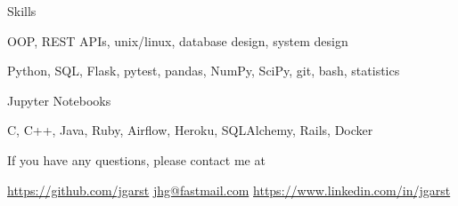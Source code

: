 \documentclass[11pt,a4paper]{article}
\begin{document}
\begin{mysection}{Skills}

    \begin{addmargin}[0.5em]{0em}

    \phantom{\large\bfseries Software Fundamentals: \quad}OOP, REST APIs, unix/linux, database design, system design
    \end{addmargin}

    \begin{addmargin}[0.5em]{0em}
        \phantom{\large\bfseries Software Fundamentals: \quad}Python, SQL, Flask, pytest, pandas, NumPy, SciPy, git, bash, statistics

    \end{addmargin}

    \begin{addmargin}[0.5em]{0em}
        \phantom{\large\bfseries Software Fundamentals: \quad}Jupyter Notebooks
    \end{addmargin}

    \begin{addmargin}[0.5em]{0em}

    \phantom{\large\bfseries Software Fundamentals: \quad}C, C++, Java, Ruby, Airflow, Heroku, SQLAlchemy, Rails, Docker
    \end{addmargin}

\end{mysection}

\vfill

\begin{center}
    If you have any questions, please contact me at
\end{center}

\begin{center}
    \href{https://github.com/jgarst}{https://github.com/jgarst} 
    \textbullet{} 
    \href{jhg@fastmail.com}{jhg@fastmail.com}
    \textbullet{} 
    \href{https://www.linkedin.com/in/jgarst}
        {https://www.linkedin.com/in/jgarst}
\end{center}
\end{document}
